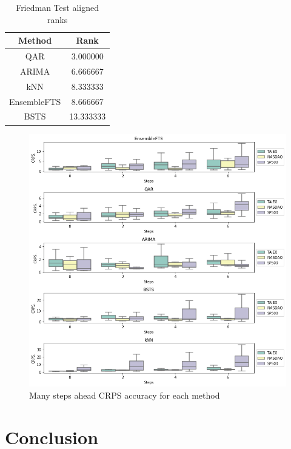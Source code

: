 \begin{table}[htb]
    \centering
    \begin{tabular}{|c|c|}
\hline
\textbf{Method} &  \textbf{Rank} \\
\hline
QAR &   3.000000 \\
ARIMA &   6.666667 \\
kNN &   8.333333 \\
EnsembleFTS &   8.666667 \\
BSTS &  13.333333 \\
\hline
\end{tabular}
    \caption{Friedman Test aligned ranks}
    \label{tab:prob_crps_ranks}
\end{table}

\begin{figure}[htb]
    \centering
    \includegraphics[width=\textwidth]{figures/probabilistic_many_steps.png}
    \caption{Many steps ahead CRPS accuracy for each method}
    \label{fig:probabilistic_many_steps}
\end{figure}


%
\section{Conclusion}
\label{sec:prob_conclusion}

